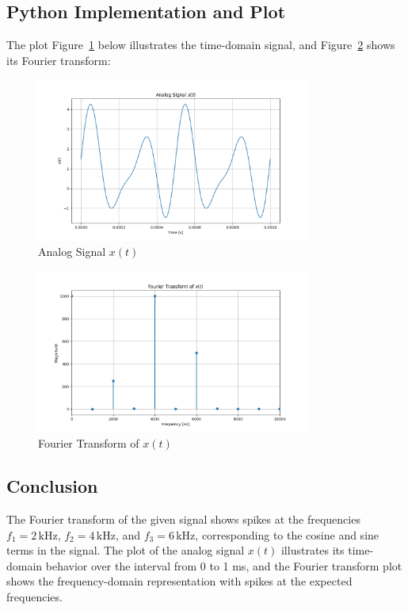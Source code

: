 \subsection*{Python Implementation and Plot}
The plot Figure~\ref{fig:ex1_a_plot} below illustrates the time-domain signal, and Figure~\ref{fig:ex1_a_fft} shows its Fourier transform:

\begin{figure}[h]
    \centering
    \includegraphics[width=0.8\textwidth]{fig/ex1_a_plot.png}
    \caption{Analog Signal $x(t)$}
    \label{fig:ex1_a_plot}
\end{figure}

\begin{figure}[h]
    \centering
    \includegraphics[width=0.8\textwidth]{fig/ex1_a_fft_stem.png}
    \caption{Fourier Transform of $x(t)$}
    \label{fig:ex1_a_fft}
\end{figure}

\subsection*{Conclusion}
The Fourier transform of the given signal shows spikes at the frequencies \( f_1 = 2 \, \text{kHz} \), \( f_2 = 4 \, \text{kHz} \), and \( f_3 = 6 \, \text{kHz} \), corresponding to the cosine and sine terms in the signal. The plot of the analog signal \( x(t) \) illustrates its time-domain behavior over the interval from 0 to 1 ms, and the Fourier transform plot shows the frequency-domain representation with spikes at the expected frequencies.
